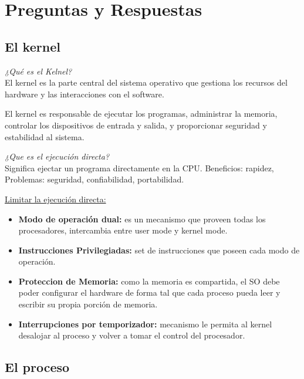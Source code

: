 \documentclass[../main.tex]{subfiles}
\begin{document}
\section{Preguntas y Respuestas}

\subsection{El kernel}
    \begin{exercise}
        \textit{¿Qué es el Kelnel?}\\

        El kernel es la parte central del sistema operativo que gestiona los recursos del hardware y las interacciones con el software. 
        
        El kernel es responsable de ejecutar los programas, administrar la memoria, controlar los dispositivos de entrada y salida, y proporcionar seguridad y estabilidad al sistema.
    \end{exercise}

    \begin{exercise}
        \textit{¿Que es el ejecución directa?}\\

        Significa ejectar un programa directamente en la CPU. Beneficios: rapidez, Problemas: seguridad, confiabilidad, portabilidad.

        \underline{Limitar la ejecución directa:} 
        \begin{itemize}
            \item \textbf{Modo de operación dual:} es un mecanismo que proveen todas los procesadores, intercambia entre user mode y kernel mode.
            \item \textbf{Instrucciones Privilegiadas:} set de instrucciones que poseen cada modo de operación.
            \item \textbf{Proteccion de Memoria:} como la memoria es compartida, el SO debe poder configurar el hardware de forma tal que cada proceso pueda leer y escribir su propia porción de memoria.
            \item \textbf{Interrupciones por temporizador:} mecanismo le permita al kernel desalojar al proceso y volver a tomar el control del procesador.
        \end{itemize}
    \end{exercise}

\subsection{El proceso}
\end{document}
